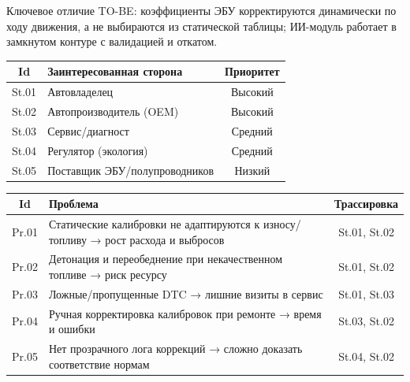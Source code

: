 \documentclass[14pt, a4paper]{extarticle}
\begin{document}
		Ключевое отличие TO-BE: коэффициенты ЭБУ корректируются динамически по ходу движения, а не выбираются из статической таблицы; ИИ-модуль работает в замкнутом контуре с валидацией и откатом.
		
		\vspace{\parindent}
		\noindent
		\begin{minipage}{\textwidth}
			\label{tab:stakeholders}
			\begin{tabularx}{\textwidth}{|c|X|c|}
				\hline
				\textbf{Id} & \textbf{Заинтересованная сторона} & \textbf{Приоритет} \\
				\hline
				St.01 & Автовладелец & Высокий \\
				\hline
				St.02 & Автопроизводитель (OEM) & Высокий \\
				\hline
				St.03 & Сервис/диагност & Средний \\
				\hline
				St.04 & Регулятор (экология) & Средний \\
				\hline
				St.05 & Поставщик ЭБУ/полупроводников & Низкий \\
				\hline
			\end{tabularx}
		\end{minipage}
		\vspace{\parindent}
		
		
		
		\vspace{\parindent}
		\noindent
		\begin{minipage}{\textwidth}
			\label{tab:problems}
			\begin{tabularx}{\textwidth}{|c|X|c|}
				\hline
				\textbf{Id} & \textbf{Проблема} & \textbf{Трассировка} \\
				\hline
				Pr.01 & Статические калибровки не адаптируются к износу/топливу → рост расхода и выбросов & St.01, St.02 \\
				\hline
				Pr.02 & Детонация и переобеднение при некачественном топливе → риск ресурсу & St.01, St.02 \\
				\hline
				Pr.03 & Ложные/пропущенные DTC → лишние визиты в сервис & St.01, St.03 \\
				\hline
				Pr.04 & Ручная корректировка калибровок при ремонте → время и ошибки & St.03, St.02 \\
				\hline
				Pr.05 & Нет прозрачного лога коррекций → сложно доказать соответствие нормам & St.04, St.02 \\
				\hline
			\end{tabularx}
		\end{minipage}
		\vspace{\parindent}
		
\end{document}
